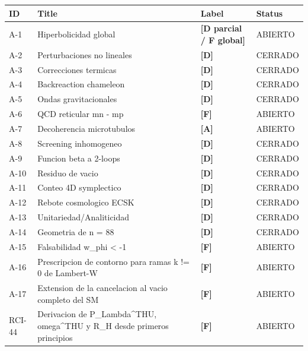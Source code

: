 ﻿\documentclass[11pt,letterpaper]{article}
\begin{document}
\begin{longtable}{@{}p{1.2cm}p{6.5cm}p{1.8cm}p{2cm}@{}}
\toprule
\textbf{ID} & \textbf{Title} & \textbf{Label} & \textbf{Status} \\
\midrule
\endhead
A-1 & Hiperbolicidad global & \textcolor{Dgreen}{\textbf{[D parcial / F global]}} & ABIERTO \\
A-2 & Perturbaciones no lineales & \textcolor{Dgreen}{\textbf{[D]}} & CERRADO \\
A-3 & Correcciones termicas & \textcolor{Dgreen}{\textbf{[D]}} & CERRADO \\
A-4 & Backreaction chameleon & \textcolor{Dgreen}{\textbf{[D]}} & CERRADO \\
A-5 & Ondas gravitacionales & \textcolor{Dgreen}{\textbf{[D]}} & CERRADO \\
A-6 & QCD reticular mn - mp & \textcolor{Forange}{\textbf{[F]}} & ABIERTO \\
A-7 & Decoherencia microtubulos & \textcolor{Ayellow}{\textbf{[A]}} & ABIERTO \\
A-8 & Screening inhomogeneo & \textcolor{Dgreen}{\textbf{[D]}} & CERRADO \\
A-9 & Funcion beta a 2-loops & \textcolor{Dgreen}{\textbf{[D]}} & CERRADO \\
A-10 & Residuo de vacio & \textcolor{Dgreen}{\textbf{[D]}} & CERRADO \\
A-11 & Conteo 4D symplectico & \textcolor{Dgreen}{\textbf{[D]}} & CERRADO \\
A-12 & Rebote cosmologico ECSK & \textcolor{Dgreen}{\textbf{[D]}} & CERRADO \\
A-13 & Unitariedad/Analiticidad & \textcolor{Dgreen}{\textbf{[D]}} & CERRADO \\
A-14 & Geometria de n = 88 & \textcolor{Dgreen}{\textbf{[D]}} & CERRADO \\
A-15 & Falsabilidad w\_phi < -1 & \textcolor{Forange}{\textbf{[F]}} & ABIERTO \\
A-16 & Prescripcion de contorno para ramas k != 0 de Lambert-W & \textcolor{Forange}{\textbf{[F]}} & ABIERTO \\
A-17 & Extension de la cancelacion al vacio completo del SM & \textcolor{Forange}{\textbf{[F]}} & ABIERTO \\
RCI-44 & Derivacion de P\_Lambda\textasciicircum{}THU, omega\textasciicircum{}THU y R\_H desde primeros principios & \textcolor{Forange}{\textbf{[F]}} & ABIERTO \\
\bottomrule
\end{longtable}
\end{document}
